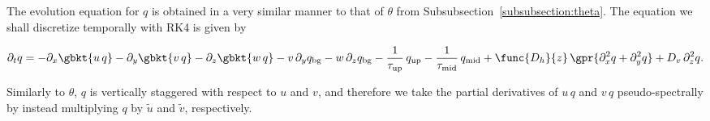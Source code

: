 The evolution equation for $q$ is obtained in a very similar manner to that of $\theta$ from Subsubsection~\ref{subsubsection:theta}. The equation we shall discretize temporally with RK4 is given by

\begin{equation}
	\partial_t q = -\partial_x \gbkt{u\,q} - \partial_y \gbkt{v\,q} - \partial_z \gbkt{w\,q} - v\,\partial_y q_{\text{bg}} - w\,\partial_z q_{\text{bg}} - \frac{1}{\tau_{\text{up}}}\,q_{\text{up}} - \frac{1}{\tau_{\text{mid}}}\,q_{\text{mid}} + \func{D_h}{z}\,\gpr{\partial_x^2 q + \partial_y^2 q} + D_v\,\partial_z^2 q.
\end{equation}

Similarly to $\theta$, $q$ is vertically staggered with respect to $u$ and $v$, and therefore we take the partial derivatives of $u\,q$ and $v\,q$ pseudo-spectrally by instead multiplying $q$ by $\widetilde{u}$ and $\widetilde{v}$, respectively.
